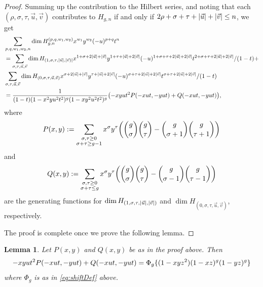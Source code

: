 \documentclass[11pt,reqno]{amsproc}
\numberwithin{equation}{section}
\newtheorem{lemma}[theorem]{Lemma}
\theoremstyle{definition}
\theoremstyle{remark}
\DeclarePairedDelimiter{\abs}{\lvert}{\rvert}
\DeclarePairedDelimiter{\set}{\{}{\}}
\DeclarePairedDelimiter{\parens}{\lparen}{\rparen}
\begin{document}
\begin{proof}
Summing up the contribution to the Hilbert series, and noting that each $(\rho,\sigma,\tau,\vec u, \vec v)$ contributes to $H_{g,n}$ if and only if $2\rho+\sigma+\tau+\abs{\vec u}+\abs{\vec v}\leq n$, we get
\begin{align}
    &\sum_{p,q,w_1,w_2,n} \dim H_{g,n}^{(p,q,w_1,w_2)} x^{w_1}y^{w_2}(-u)^{p+q}t^n\\ 
    &= \sum_{\sigma,\tau,\vec u,\vec v} \dim H_{(1,\sigma,\tau,\abs{\vec u},\abs{\vec v)}} x^{1+\sigma+2\abs{\vec u}+\abs{\vec v}} y^{1+\tau+\abs{\vec u}+2\abs{\vec v}}(-u)^{1+\sigma+\tau+2\abs{\vec u}+2\abs{\vec v}}t^{2+\sigma+\tau+2\abs{\vec u}+2\abs{\vec v}}/(1-t)+\\
    &\sum_{\sigma,\tau,\vec u,\vec v} \dim H_{(0,\sigma,\tau,\vec u,\vec v)} x^{\sigma+2\abs{\vec u}+\abs{\vec v}} y^{\tau+\abs{\vec u}+2\abs{\vec v}}(-u)^{\sigma+\tau+2\abs{\vec u}+2\abs{\vec v}}t^{\sigma+\tau+2\abs{\vec u}+2\abs{\vec v}}/(1-t)\\
    &=\frac{1}{(1-t)(1-x^2 yu^2t^2)^g(1-xy^2u^2t^2)^g}\parens*{-xyut^2 P(-xut,-yut)+Q(-xut,-yut)},
\end{align}
where $$P(x,y):=\sum_{\substack{\sigma,\tau\geq 0\\\sigma+\tau\geq g-1}} x^\sigma y^\tau \parens*{\binom{g}{\sigma}\binom{g}{\tau}-\binom{g}{\sigma+1}\binom{g}{\tau+1}}$$ and $$Q(x,y):=\sum_{\substack{\sigma,\tau\geq 0\\\sigma+\tau\leq g}}x^\sigma y^\tau \parens*{\binom{g}{\sigma}\binom{g}{\tau}-\binom{g}{\sigma-1}\binom{g}{\tau-1}}$$
are the generating functions for $\dim H_{(1,\sigma,\tau,\abs{\vec u},\abs{\vec v})}$ and $\dim H_{(0,\sigma,\tau,\vec u,\vec v)}$, respectively.

The proof is complete once we prove the following lemma.
\end{proof}

\begin{lemma}\label{FinishingTouch}
    Let $P(x,y)$ and $Q(x,y)$ be as in the proof above. Then
    \begin{equation}\label{eq:finish}
        -xyut^2 P(-xut,-yut)+Q(-xut,-yut) = \Phi_g\set{(1-xyz^2)(1-xz)^g(1-yz)^g}
    \end{equation}
    where $\Phi_g$ is as in \eqref{eq:shiftDef} above.
\end{lemma}
\end{document}
